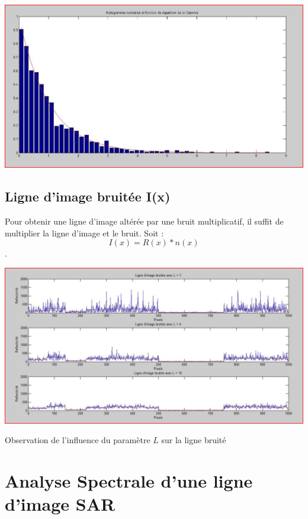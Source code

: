 \documentclass[a4paper,11pt]{article}
\newcommand{\FSource}[1]{%
  
  }
\begin{document}
\vspace{0.5cm}

\FSource{matlab/2.m}

\vspace{0.5cm}

\includegraphics[width=15cm]{capture/bruit.JPG}

\subsection{Ligne d'image bruitée I(x)}

Pour obtenir une ligne d'image altérée par une bruit multiplicatif, il suffit de multiplier la ligne d'image et le bruit. Soit :
$$I(x) = R(x) * n(x)$$.

\includegraphics[width=15cm]{capture/ligne.JPG}
\begin{center}Observation de l'influence du paramètre $L$ sur la ligne
bruité\end{center}

\newpage

\section{Analyse Spectrale d'une ligne d'image SAR}
\end{document}
